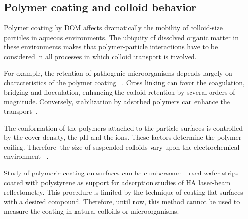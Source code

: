 \documentclass[journal=langd5,manuscript=article]{achemso}
\begin{document}
\subsection{Polymer coating and colloid behavior}

Polymer coating by DOM affects dramatically the mobility of colloid-size particles in aqueous environments. The ubiquity of dissolved organic matter in these environments makes that polymer-particle interactions have to be considered in all processes in which colloid transport is involved.

For example, the retention of pathogenic microorganisms depends largely on characteristics of the polymer coating~\cite{Morales2011a} . Cross linking can favor the coagulation, bridging and flocculation, enhancing the colloid retention by several orders of magnitude. Conversely,  stabilization by adsorbed polymers can enhance the transport~\cite{Keller2010}.

The conformation of the polymers attached to the particle surfaces is controlled by the cover density, the pH and the ions. These factors determine the polymer coiling. Therefore, the size of suspended colloids vary upon the electrochemical environment~\cite{Morales2011a} .


Study of polymeric coating   on surfaces can be cumbersome.~\citeauthor{doi:10.1021/es981236u}\cite{doi:10.1021/es981236u}
used   wafer strips coated with  polystyrene as support for
adsorption studies of HA laser-beam reflectometry. This procedure is
limited by the technique of coating flat surfaces with a desired compound. Therefore, until now, this method cannot be used to measure the coating in natural colloids or microorganisms.





\end{document}
